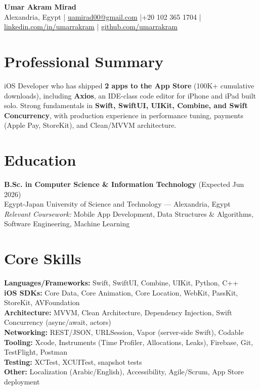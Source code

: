 \documentclass[a4paper,10pt]{article}
\begin{document}
\begin{center}
    {\LARGE \textbf{Umar Akram Mirad}}\\[4pt]
    Alexandria, Egypt \quad|\quad
    \href{mailto:uamirad00@gmail.com}{uamirad00@gmail.com} \quad|\quad +20 102 365 1704 \quad|\quad
    \href{https://linkedin.com/in/umarrakram}{linkedin.com/in/umarrakram} \quad|\quad
    \href{https://github.com/umarrakram}{github.com/umarrakram}
\end{center}

\section*{Professional Summary}
iOS Developer who has shipped \textbf{2 apps to the App Store} (100K+ cumulative downloads), including \textbf{Axios}, an IDE-class code editor for iPhone and iPad built solo. Strong fundamentals in \textbf{Swift, SwiftUI, UIKit, Combine, and Swift Concurrency}, with production experience in performance tuning, payments (Apple Pay, StoreKit), and Clean/MVVM architecture.

\section*{Education}
\textbf{B.Sc. in Computer Science \& Information Technology} (Expected Jun 2026) \\
Egypt-Japan University of Science and Technology --- Alexandria, Egypt \\
\emph{Relevant Coursework:} Mobile App Development, Data Structures \& Algorithms, Software Engineering, Machine Learning

\section*{Core Skills}
\textbf{Languages/Frameworks:} Swift, SwiftUI, Combine, UIKit, Python, C++ \\
\textbf{iOS SDKs:} Core Data, Core Animation, Core Location, WebKit, PassKit, StoreKit, AVFoundation \\
\textbf{Architecture:} MVVM, Clean Architecture, Dependency Injection, Swift Concurrency (async/await, actors) \\
\textbf{Networking:} REST/JSON, URLSession, Vapor (server-side Swift), Codable \\
\textbf{Tooling:} Xcode, Instruments (Time Profiler, Allocations, Leaks), Firebase, Git, TestFlight, Postman \\
\textbf{Testing:} XCTest, XCUITest, snapshot tests \\
\textbf{Other:} Localization (Arabic/English), Accessibility, Agile/Scrum, App Store deployment
\end{document}
